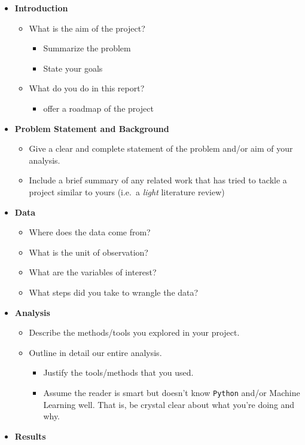 \documentclass[
  12pt,
]{article}
\providecommand{\tightlist}{%
  \setlength{\itemsep}{0pt}\setlength{\parskip}{0pt}}
\begin{document}
\begin{itemize}
\item
  \textbf{Introduction}

  \begin{itemize}
  \tightlist
  \item
    What is the aim of the project?

    \begin{itemize}
    \tightlist
    \item
      Summarize the problem
    \item
      State your goals
    \end{itemize}
  \item
    What do you do in this report?

    \begin{itemize}
    \tightlist
    \item
      offer a roadmap of the project
    \end{itemize}
  \end{itemize}
\item
  \textbf{Problem Statement and Background}

  \begin{itemize}
  \item
    Give a clear and complete statement of the problem and/or aim of
    your analysis.
  \item
    Include a brief summary of any related work that has tried to tackle
    a project similar to yours (i.e.~a \emph{light} literature review)
  \end{itemize}
\item
  \textbf{Data}

  \begin{itemize}
  \item
    Where does the data come from?
  \item
    What is the unit of observation?
  \item
    What are the variables of interest?
  \item
    What steps did you take to wrangle the data?
  \end{itemize}
\item
  \textbf{Analysis}

  \begin{itemize}
  \item
    Describe the methods/tools you explored in your project.
  \item
    Outline in detail our entire analysis.

    \begin{itemize}
    \tightlist
    \item
      Justify the tools/methods that you used.
    \item
      Assume the reader is smart but doesn't know \texttt{Python} and/or
      Machine Learning well. That is, be crystal clear about what you're
      doing and why.
    \end{itemize}
  \end{itemize}
\item
  \textbf{Results}


\end{itemize}
\end{document}
